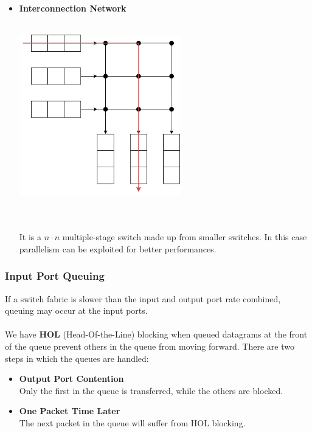 \documentclass{article}
\begin{document}
\begin{itemize}
	\newpage	
	
	\item \textbf{Interconnection Network}
	\vspace{.2cm} \\ \\
	\centerline{\includegraphics[width=7cm]{./assets/interconnection.png}} \\ \\
	It is a $n \cdot n$ multiple-stage switch made up from smaller switches. In this case parallelism can be exploited for better performances.
\end{itemize}

\subsubsection{Input Port Queuing}
If a switch fabric is slower than the input and output port rate combined, queuing may occur at the input ports. \\ \\
We have \textbf{HOL} (Head-Of-the-Line) blocking when queued datagrams at the front of the queue prevent others in the queue from moving forward. There are two steps in which the queues are handled:

\begin{itemize}
	\item \textbf{Output Port Contention}
	\vspace{.2cm} \\
	Only the first in the queue is transferred, while the others are blocked.
	
	\item \textbf{One Packet Time Later}
	\vspace{.2cm} \\
	The next packet in the queue will suffer from HOL blocking.
\end{itemize}
\end{document}
